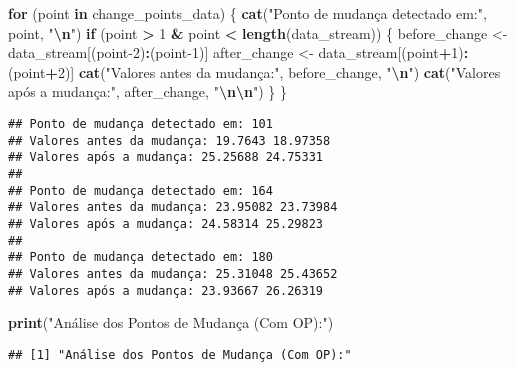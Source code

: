 \documentclass[
]{article}
\newenvironment{Shaded}{\begin{snugshade}}{\end{snugshade}}
\newcommand{\ControlFlowTok}[1]{\textcolor[rgb]{0.13,0.29,0.53}{\textbf{#1}}}
\newcommand{\DecValTok}[1]{\textcolor[rgb]{0.00,0.00,0.81}{#1}}
\newcommand{\FunctionTok}[1]{\textcolor[rgb]{0.13,0.29,0.53}{\textbf{#1}}}
\newcommand{\NormalTok}[1]{#1}
\newcommand{\OtherTok}[1]{\textcolor[rgb]{0.56,0.35,0.01}{#1}}
\newcommand{\SpecialCharTok}[1]{\textcolor[rgb]{0.81,0.36,0.00}{\textbf{#1}}}
\newcommand{\StringTok}[1]{\textcolor[rgb]{0.31,0.60,0.02}{#1}}
\begin{document}
\begin{Shaded}
\begin{Highlighting}[]
\ControlFlowTok{for}\NormalTok{ (point }\ControlFlowTok{in}\NormalTok{ change\_points\_data) \{}
  \FunctionTok{cat}\NormalTok{(}\StringTok{"Ponto de mudança detectado em:"}\NormalTok{, point, }\StringTok{"}\SpecialCharTok{\textbackslash{}n}\StringTok{"}\NormalTok{)}
  \ControlFlowTok{if}\NormalTok{ (point }\SpecialCharTok{\textgreater{}} \DecValTok{1} \SpecialCharTok{\&}\NormalTok{ point }\SpecialCharTok{\textless{}} \FunctionTok{length}\NormalTok{(data\_stream)) \{}
\NormalTok{    before\_change }\OtherTok{\textless{}{-}}\NormalTok{ data\_stream[(point}\DecValTok{{-}2}\NormalTok{)}\SpecialCharTok{:}\NormalTok{(point}\DecValTok{{-}1}\NormalTok{)]}
\NormalTok{    after\_change }\OtherTok{\textless{}{-}}\NormalTok{ data\_stream[(point}\SpecialCharTok{+}\DecValTok{1}\NormalTok{)}\SpecialCharTok{:}\NormalTok{(point}\SpecialCharTok{+}\DecValTok{2}\NormalTok{)]}
    \FunctionTok{cat}\NormalTok{(}\StringTok{"Valores antes da mudança:"}\NormalTok{, before\_change, }\StringTok{"}\SpecialCharTok{\textbackslash{}n}\StringTok{"}\NormalTok{)}
    \FunctionTok{cat}\NormalTok{(}\StringTok{"Valores após a mudança:"}\NormalTok{, after\_change, }\StringTok{"}\SpecialCharTok{\textbackslash{}n\textbackslash{}n}\StringTok{"}\NormalTok{)}
\NormalTok{  \}}
\NormalTok{\}}
\end{Highlighting}
\end{Shaded}

\begin{verbatim}
## Ponto de mudança detectado em: 101 
## Valores antes da mudança: 19.7643 18.97358 
## Valores após a mudança: 25.25688 24.75331 
## 
## Ponto de mudança detectado em: 164 
## Valores antes da mudança: 23.95082 23.73984 
## Valores após a mudança: 24.58314 25.29823 
## 
## Ponto de mudança detectado em: 180 
## Valores antes da mudança: 25.31048 25.43652 
## Valores após a mudança: 23.93667 26.26319
\end{verbatim}

\begin{Shaded}
\begin{Highlighting}[]
\FunctionTok{print}\NormalTok{(}\StringTok{"Análise dos Pontos de Mudança (Com OP):"}\NormalTok{)}
\end{Highlighting}
\end{Shaded}

\begin{verbatim}
## [1] "Análise dos Pontos de Mudança (Com OP):"
\end{verbatim}
\end{document}
